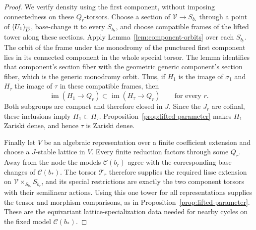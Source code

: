 \begin{proof}
We verify density using the first component, without imposing
connectedness on these $Q_r$-torsors.  Choose a section of
$\mathcal V\to S_{b_*}$ through a point of $(U_1)_{\overline D}$,
base-change it to every $S_{b_r}$, and choose compatible frames of the
lifted tower along these sections.  Apply
Lemma~\ref{lem:component-orbits} over each $S_{b_r}$.  The orbit of
the frame under the monodromy of the punctured first component lies
in its connected component in the whole special torsor.  The lemma
identifies that component's section fiber with the geometric generic
component's section fiber, which is the generic monodromy orbit.
Thus, if $H_1$ is the image of $\sigma_1$ and $H_\tau$ the image of
$\tau$ in these compatible frames, then
\[
        \operatorname{im}(H_1\to Q_r)
          \subset\operatorname{im}(H_\tau\to Q_r)
        \qquad\text{for every }r.
\]
Both subgroups are compact and therefore closed in $J$.  Since the
$J_r$ are cofinal, these inclusions imply $H_1\subset H_\tau$.
Proposition~\ref{prop:lifted-parameter} makes $H_1$ Zariski dense,
and hence $\tau$ is Zariski dense.

Finally let $V$ be an algebraic representation over a finite
coefficient extension and choose a $J$-stable lattice in $V$.
Every finite reduction factors through some $Q_r$.  Away from the
node the models $\mathcal C(b_r)$ agree with the corresponding
base changes of $\mathcal C(b_*)$.  The torsor $\mathcal T_r$
therefore supplies the required lisse extension on
$\mathcal V\times_{S_{b_*}}S_{b_r}$, and its special restrictions
are exactly the two component torsors with their semilinear actions.
Using this one tower for all representations supplies the tensor and
morphism comparisons, as in Proposition~\ref{prop:lifted-parameter}.
These are the equivariant lattice-specialization data needed for
nearby cycles on the fixed model $\mathcal C(b_*)$.
\end{proof}
